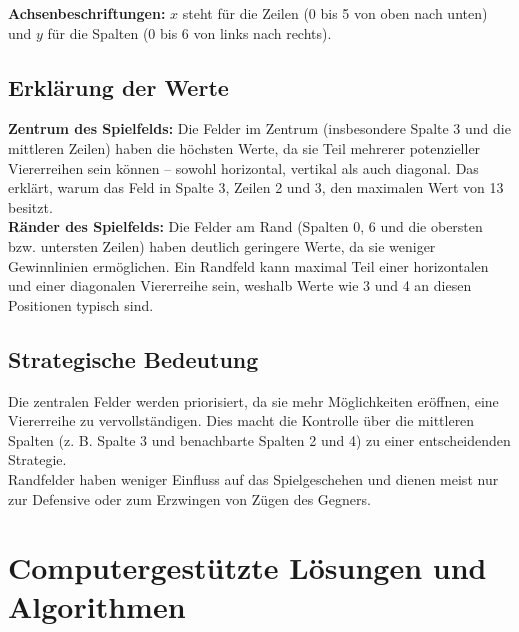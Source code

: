 	\textbf{Achsenbeschriftungen:} \(x\) steht für die Zeilen (0 bis 5 von oben nach unten) und \(y\) für die Spalten (0 bis 6 von links nach rechts).
	
	\subsection*{Erklärung der Werte}
	\textbf{Zentrum des Spielfelds:} Die Felder im Zentrum (insbesondere Spalte 3 und die mittleren Zeilen) haben die höchsten Werte, da sie Teil mehrerer potenzieller Viererreihen sein können – sowohl horizontal, vertikal als auch diagonal. Das erklärt, warum das Feld in Spalte 3, Zeilen 2 und 3, den maximalen Wert von 13 besitzt.\\
	
	\textbf{Ränder des Spielfelds:} Die Felder am Rand (Spalten 0, 6 und die obersten bzw. untersten Zeilen) haben deutlich geringere Werte, da sie weniger Gewinnlinien ermöglichen. Ein Randfeld kann maximal Teil einer horizontalen und einer diagonalen Viererreihe sein, weshalb Werte wie 3 und 4 an diesen Positionen typisch sind.
	
	\subsection*{Strategische Bedeutung}
	Die zentralen Felder werden priorisiert, da sie mehr Möglichkeiten eröffnen, eine Viererreihe zu vervollständigen. Dies macht die Kontrolle über die mittleren Spalten (z. B. Spalte 3 und benachbarte Spalten 2 und 4) zu einer entscheidenden Strategie.\\
	Randfelder haben weniger Einfluss auf das Spielgeschehen und dienen meist nur zur Defensive oder zum Erzwingen von Zügen des Gegners.
	
	
\section{Computergestützte Lösungen und Algorithmen}
	